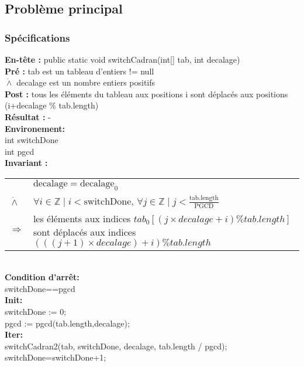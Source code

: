 \subsection{Problème principal}
\subsubsection*{Spécifications}
\noindent \textbf{En-tête :} public static void switchCadran(int[] tab, int decalage)\\
\noindent \textbf{Pré :} tab est un tableau d'entiers != null\\
\indent $\dot{\wedge}$ decalage est un nombre entiers positifs\\
\textbf{Post :} tous les éléments du tableau aux positions i sont déplacés aux positions (i+decalage \% tab.length)\\
\textbf{Résultat :} - \\

\noindent \textbf{Environement: }\\
int switchDone\\
int pgcd\\

\noindent \textbf{Invariant :}

\begin{tabular}{lp{14cm}}

& $\mathrm{decalage}=\mathrm{decalage}_{0}$ \\
$\dot{\wedge}$ & $\forall i \in \mathbb{Z} \mid i < \mathrm{switchDone} $, $\forall j \in \mathbb{Z} \mid j < \frac{\mathrm{tab.length}}{\mathrm{PGCD}}$ \\
$\Rightarrow$ & les éléments aux indices $tab_{0}[(j \times decalage + i) \% tab.length]$ sont déplacés aux indices $(((j+1)\times decalage)+i) \% tab.length$ \\
\end{tabular}\\

\noindent \textbf{Condition d'arrêt: }\\
switchDone==pgcd \\

\noindent \textbf{Init: }\\
switchDone := 0;\\
pgcd := pgcd(tab.length,decalage); \\

\noindent \textbf{Iter: } \\
switchCadran2(tab, switchDone, decalage, tab.length / pgcd); \\
switchDone=switchDone+1;

